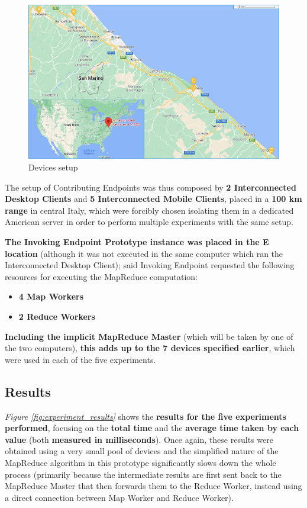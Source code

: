 \begin{figure}[!ht]
    \centering
    \includegraphics[width=\linewidth]{document/chapters/chapter_7/images/experiment_devices_setup.png}
    \caption{Devices setup}
    \label{fig:experiment_devices_setup}
\end{figure}

The setup of Contributing Endpoints was thus composed by \textbf{2 Interconnected Desktop Clients} and \textbf{5 Interconnected Mobile Clients}, placed in a \textbf{100 km range} in central Italy, which were forcibly chosen isolating them in a dedicated American server in order to perform multiple experiments with the same setup.

\textbf{The Invoking Endpoint Prototype instance was placed in the E location} (although it was not executed in the same computer which ran the Interconnected Desktop Client); said Invoking Endpoint requested the following resources for executing the MapReduce computation:
\begin{itemize}
    \item \textbf{4 Map Workers}
    \item \textbf{2 Reduce Workers}
\end{itemize}
    \textbf{Including the implicit MapReduce Master} (which will be taken by one of the two computers), \textbf{this adds up to the 7 devices specified earlier}, which were used in each of the five experiments.

\subsection{Results}
\textit{Figure \ref{fig:experiment_results}} shows the \textbf{results for the five experiments performed}, focusing on the \textbf{total time} and the \textbf{average time taken by each value} (both \textbf{measured in milliseconds}). Once again, these results were obtained using a very small pool of devices and the simplified nature of the MapReduce algorithm in this prototype significantly slows down the whole process (primarily because the intermediate results are first sent back to the MapReduce Master that then forwards them to the Reduce Worker, instead using a direct connection between Map Worker and Reduce Worker).

